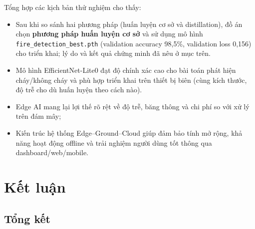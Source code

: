 \documentclass[12pt,a4paper]{report}
\begin{document}
Tổng hợp các kịch bản thử nghiệm cho thấy:
\begin{itemize}
  \item Sau khi so sánh hai phương pháp (huấn luyện cơ sở và distillation), đồ án chọn \textbf{phương pháp huấn luyện cơ sở} và sử dụng mô hình \texttt{fire\_detection\_best.pth} (validation accuracy 98{,}5\%, validation loss 0{,}156) cho triển khai; lý do và kết quả chứng minh đã nêu ở mục trên.
  \item Mô hình EfficientNet-Lite0 đạt độ chính xác cao cho bài toán phát hiện cháy/không cháy và phù hợp triển khai trên thiết bị biên (cùng kích thước, độ trễ cho dù huấn luyện theo cách nào).
  \item Edge AI mang lại lợi thế rõ rệt về độ trễ, băng thông và chi phí so với xử lý trên đám mây;
  \item Kiến trúc hệ thống Edge--Ground--Cloud giúp đảm bảo tính mở rộng, khả năng hoạt động offline và trải nghiệm người dùng tốt thông qua dashboard/web/mobile.
\end{itemize}

\chapter{Kết luận}

\section{Tổng kết}
\end{document}
